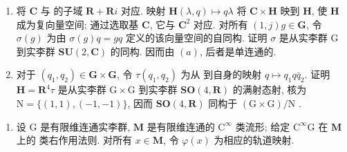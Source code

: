 \begin{enumerate}
\def\labelenumi{(\alph{enumi})}
\setcounter{enumi}{2}
\item
  将 \(\mathbf{C}\) 与  的子域 \(\mathbf{R} + \mathbf{R}i\) 对应. 映射 \(\mathbf{H}\)\((\lambda, q) \mapsto q\lambda\) 将 \(\mathbf{C} \times \mathbf{H}\) 映到 \(\mathbf{H}\), 使 \(\mathbf{H}\) 成为复向量空间; 通过选取基 \(\mathbf{C}\), 它与 \(\mathbf{C}^2\) 对应. 对所有 \((1, j)\)\(g \in \mathbf{G}\), 令 \(\sigma(g)\) 为由 \(\sigma(g)q = gq\) 定义的该向量空间的自同构. 证明 \(\sigma\) 是从实李群 G 到实李群 \(\mathbf{SU}(2, \mathbf{C})\) 的同构. 因而由 \((a)\), 后者是单连通的.
\item
  对于 \((q_{1}, q_{2}) \in \mathbf{G} \times \mathbf{G}\), 令 \(\tau(q_{1}, q_{2})\) 为从  到自身的映射 \(q \mapsto q_{1}q\bar{q}_{2}\). 证明 \(\mathbf{H} = \mathbf{R}^{4}\)\(\tau\) 是从实李群 \(\mathrm{G} \times \mathrm{G}\) 到实李群 \(\mathbf{SO}(4, \mathbf{R})\) 的满射态射, 核为 \(\mathrm{N} = \{(1, 1), (-1, -1)\}\), 因而 \(\mathbf{SO}(4, \mathbf{R})\) 同构于 \((\mathrm{G} \times \mathrm{G}) / \mathrm{N}\) .
\end{enumerate}

\begin{enumerate}
\def\labelenumi{\arabic{enumi}.}
\setcounter{enumi}{7}
\tightlist
\item
  设 \(\mathrm{G}\) 是有限维连通实李群, \(\mathbf{M}\) 是有限维连通的 \(\mathrm{C}^{\infty}\) 类流形; 给定 \(\mathrm{C}^{\infty}\)\(\mathrm{G}\) 在 \(\mathbf{M}\) 上的  类右作用法则. 对所有 \(x \in \mathbf{M}\), 令 \(\varphi(x)\) 为相应的轨道映射.
\end{enumerate}

